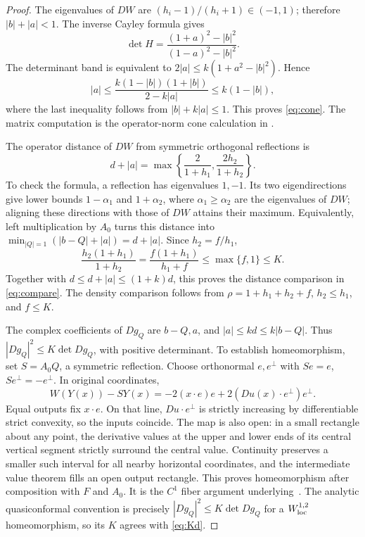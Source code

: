 \documentclass[11pt]{article}
\theoremstyle{remark}
\numberwithin{equation}{section}
\begin{document}
\begin{proof}
The eigenvalues of \(DW\) are \((h_i-1)/(h_i+1)\in(-1,1)\);
therefore \(|b|+|a|<1\). The inverse Cayley formula gives
\[
\det H=\frac{(1+a)^2-|b|^2}{(1-a)^2-|b|^2}.
\]
The determinant band is equivalent to
\(2|a|\le k(1+a^2-|b|^2)\). Hence
\[
|a|\le\frac{k(1-|b|)(1+|b|)}{2-k|a|}
\le k(1-|b|),
\]
where the last inequality follows from \(|b|+k|a|\le1\).
This proves \eqref{eq:cone}.
The matrix computation is the operator-norm cone calculation in
\cite[Lemma~6.3]{DPGT}.

The operator distance of \(DW\) from symmetric orthogonal reflections is
\[
d+|a|=\max\left\{\frac{2}{1+h_1},\frac{2h_2}{1+h_2}\right\}.
\]
To check the formula, a reflection has eigenvalues \(1,-1\).
Its two eigendirections give lower bounds \(1-\alpha_1\) and
\(1+\alpha_2\), where \(\alpha_1\ge\alpha_2\) are the eigenvalues of \(DW\);
aligning these directions with those of \(DW\) attains their maximum.
Equivalently, left multiplication by \(A_0\) turns this distance into
\(\min_{|Q|=1}(|b-Q|+|a|)=d+|a|\).
Since \(h_2=f/h_1\),
\[
\frac{h_2(1+h_1)}{1+h_2}
=\frac{f(1+h_1)}{h_1+f}\le\max\{f,1\}\le K.
\]
Together with \(d\le d+|a|\le(1+k)d\), this proves the distance
comparison in \eqref{eq:compare}. The density comparison follows from
\(\rho=1+h_1+h_2+f\), \(h_2\le h_1\), and \(f\le K\).

The complex coefficients of \(Dg_Q\) are \(b-Q,a\), and
\(|a|\le kd\le k|b-Q|\).
Thus \(|Dg_Q|^2\le K\det Dg_Q\), with positive determinant.
To establish homeomorphism, set \(S=A_0Q\), a symmetric reflection.
Choose orthonormal \(e,e^\perp\) with \(Se=e\), \(Se^\perp=-e^\perp\).
In original coordinates,
\[
W(Y(x))-SY(x)
=-2(x\cdot e)e+2(Du(x)\cdot e^\perp)e^\perp.
\]
Equal outputs fix \(x\cdot e\). On that line, \(Du\cdot e^\perp\)
is strictly increasing by differentiable strict convexity, so the inputs
coincide. The map is also open: in a small rectangle about any point,
the derivative values at the upper and lower ends of its central vertical
segment strictly surround the central value. Continuity preserves a
smaller such interval for all nearby horizontal coordinates, and
the intermediate value theorem fills an open output rectangle.
This proves homeomorphism after composition with \(F\) and \(A_0\).
It is the \(C^1\) fiber argument underlying~\cite[Lemma~6.9]{DPGT}.
The analytic quasiconformal convention
\cite[\S2.1]{DPGT} is precisely
\(|Dg_Q|^2\le K\det Dg_Q\) for a \(W^{1,2}_{\rm loc}\) homeomorphism,
so its \(K\) agrees with \eqref{eq:Kd}.
\end{proof}
\end{document}

